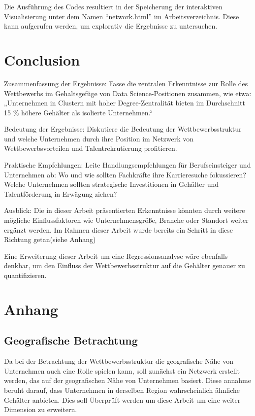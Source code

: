 \documentclass[
]{article}
\begin{document}
Die Ausführung des Codes resultiert in der Speicherung der interaktiven
Visualisierung unter dem Namen ``network.html'' im Arbeitsverzeichnis.
Diese kann aufgerufen werden, um explorativ die Ergebnisse zu
untersuchen.

\newpage

\section{Conclusion}\label{conclusion}

Zusammenfassung der Ergebnisse: Fasse die zentralen Erkenntnisse zur
Rolle des Wettbewerbs im Gehaltsgefüge von Data Science-Positionen
zusammen, wie etwa: „Unternehmen in Clustern mit hoher
Degree-Zentralität bieten im Durchschnitt 15 \% höhere Gehälter als
isolierte Unternehmen.``

Bedeutung der Ergebnisse: Diskutiere die Bedeutung der
Wettbewerbsstruktur und welche Unternehmen durch ihre Position im
Netzwerk von Wettbewerbsvorteilen und Talentrekrutierung profitieren.

Praktische Empfehlungen: Leite Handlungsempfehlungen für
Berufseinsteiger und Unternehmen ab: Wo und wie sollten Fachkräfte ihre
Karrieresuche fokussieren? Welche Unternehmen sollten strategische
Investitionen in Gehälter und Talentförderung in Erwägung ziehen?

Ausblick: Die in dieser Arbeit präsentierten Erkenntnisse könnten durch
weitere mögliche Einflussfaktoren wie Unternehmensgröße, Branche oder
Standort weiter ergänzt werden. Im Rahmen dieser Arbeit wurde bereits
ein Schritt in diese Richtung getan(siehe Anhang)

Eine Erweiterung dieser Arbeit um eine Regressionsanalyse wäre ebenfalls
denkbar, um den Einfluss der Wettbewerbsstruktur auf die Gehälter
genauer zu quantifizieren.

\newpage

\section{Anhang}\label{anhang}

\subsection{Geografische Betrachtung}\label{geografische-betrachtung}

Da bei der Betrachtung der Wettbewerbsstruktur die geografische Nähe von
Unternehmen auch eine Rolle spielen kann, soll zunächst ein Netzwerk
erstellt werden, das auf der geografischen Nähe von Unternehmen basiert.
Diese annahme beruht darauf, dass Unternehmen in derselben Region
wahrscheinlich ähnliche Gehälter anbieten. Dies soll Überprüft werden um
diese Arbeit um eine weiter Dimension zu erweitern.
\end{document}
